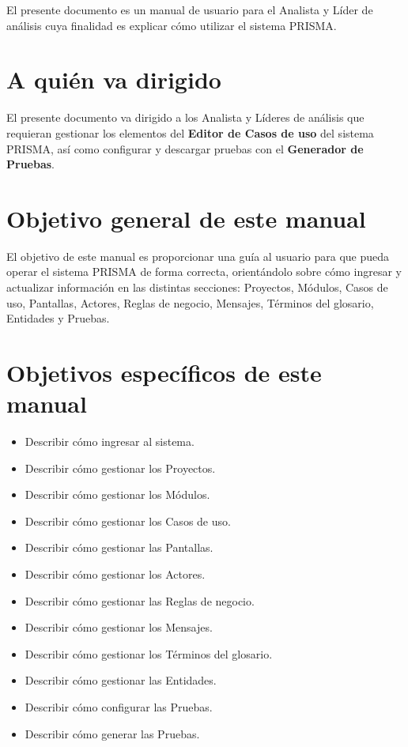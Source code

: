 El presente documento es un manual de usuario para el Analista y Líder de análisis cuya finalidad es explicar cómo utilizar el sistema PRISMA.\\

\section{A quién va dirigido}

El presente documento va dirigido a los Analista y Líderes de análisis que requieran gestionar los elementos del {\bf Editor de Casos de uso} del sistema PRISMA, así como configurar y descargar pruebas con el {\bf Generador de Pruebas}.\\


\section{Objetivo general de este manual}
\label{sec:ObjetivoGeneralManual}

El objetivo de este manual es proporcionar una guía al usuario para que pueda operar el sistema PRISMA de forma correcta, orientándolo sobre cómo ingresar y 
actualizar información en las distintas secciones: Proyectos, Módulos, Casos de uso, Pantallas, Actores, Reglas de negocio, Mensajes, Términos del glosario, Entidades y Pruebas.\\


\section{Objetivos específicos de este manual}

\begin{itemize}
	\item Describir cómo ingresar al sistema.
	\item Describir cómo gestionar los Proyectos.
	\item Describir cómo gestionar los Módulos.
	\item Describir cómo gestionar los Casos de uso.
	\item Describir cómo gestionar las Pantallas.
	\item Describir cómo gestionar los Actores.
	\item Describir cómo gestionar las Reglas de negocio.
	\item Describir cómo gestionar los Mensajes.
	\item Describir cómo gestionar los Términos del glosario.
	\item Describir cómo gestionar las Entidades.
	\item Describir cómo configurar las Pruebas.
	\item Describir cómo generar las Pruebas.
\end{itemize}
